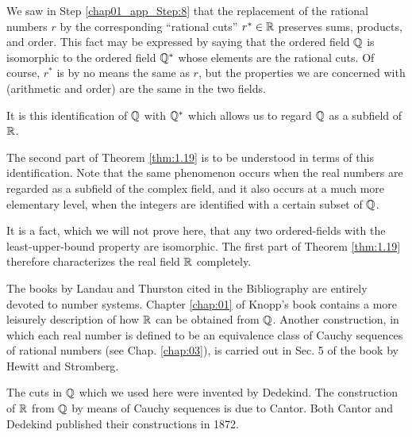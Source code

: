 \label{chap01_app_Step:9}
We saw in Step \ref{chap01_app_Step:8} that the replacement of the rational numbers $r$
by the corresponding ``rational cuts'' $r^* \in {\protect\mathbb R}$ preserves sums, products, and order.
This fact may be expressed by saying that
the ordered field ${\protect\mathbb Q}$ is isomorphic to the ordered field ${\protect\mathbb Q}^*$
whose elements are the rational cuts.
Of course, $r^*$ is by no means the same as $r$,
but the properties we are concerned with (arithmetic and order) are the same in the two fields.

It is this identification of ${\protect\mathbb Q}$ with ${\protect\mathbb Q}^*$ which allows us to regard ${\protect\mathbb Q}$ as a subfield of ${\protect\mathbb R}$.

The second part of Theorem \ref{thm:1.19} is to be understood in terms of this identification.
Note that the same phenomenon occurs when the real numbers are regarded as a subfield of the complex field,
and it also occurs at a much more elementary level, when the integers are identified with a certain subset of ${\protect\mathbb Q}$.

It is a fact, which we will not prove here, that any two ordered-fields with the least-upper-bound property are isomorphic.
The first part of Theorem \ref{thm:1.19} therefore characterizes the real field ${\protect\mathbb R}$ completely.

The books by Landau and Thurston\cite{LANDAU1951} cited in the Bibliography are entirely devoted to number systems.
Chapter \ref{chap:01} of Knopp's\cite{KNOPP1928} book contains a more leisurely description of how ${\protect\mathbb R}$ can be obtained from ${\protect\mathbb Q}$.
Another construction,
in which each real number is defined to be an equivalence class of Cauchy sequences of rational numbers (see Chap. \ref{chap:03}),
is carried out in Sec. 5 of the book by Hewitt and Stromberg\cite{HEWITT1965}.

The cuts in ${\protect\mathbb Q}$ which we used here were invented by Dedekind.
The construction of ${\protect\mathbb R}$ from ${\protect\mathbb Q}$ by means of Cauchy sequences is due to Cantor.
Both Cantor and Dedekind published their constructions in 1872.

